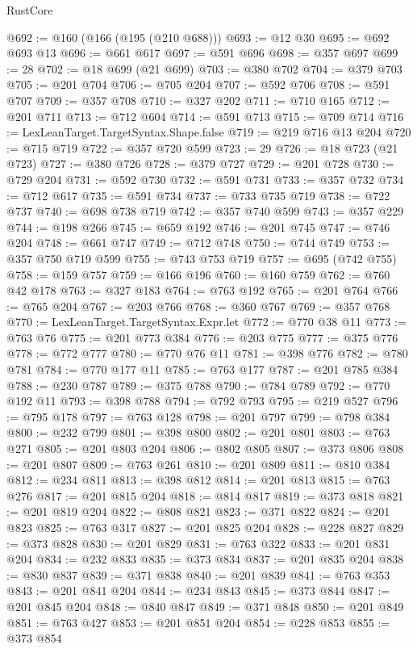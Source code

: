 \begin{lexlean}{RustCore}
\begin{coremodule}
@692 := @160 (@166 (@195 (@210 @688)))
@693 := @12 @30
@695 := @692 @693 @13
@696 := @661 @617
@697 := @591 @696
@698 := @357 @697
@699 := 28
@702 := @18 @699 (@21 @699)
@703 := @380 @702
@704 := @379 @703
@705 := @201 @704
@706 := @705 @204
@707 := @592 @706
@708 := @591 @707
@709 := @357 @708
@710 := @327 @202
@711 := @710 @165
@712 := @201 @711
@713 := @712 @604
@714 := @591 @713
@715 := @709 @714
@716 := LexLeanTarget.TargetSyntax.Shape.false
@719 := @219 @716 @13 @204
@720 := @715 @719
@722 := @357 @720 @599
@723 := 29
@726 := @18 @723 (@21 @723)
@727 := @380 @726
@728 := @379 @727
@729 := @201 @728
@730 := @729 @204
@731 := @592 @730
@732 := @591 @731
@733 := @357 @732
@734 := @712 @617
@735 := @591 @734
@737 := @733 @735 @719
@738 := @722 @737
@740 := @698 @738 @719
@742 := @357 @740 @599
@743 := @357 @229
@744 := @198 @266
@745 := @659 @192
@746 := @201 @745
@747 := @746 @204
@748 := @661 @747
@749 := @712 @748
@750 := @744 @749
@753 := @357 @750 @719 @599
@755 := @743 @753 @719
@757 := @695 (@742 @755)
@758 := @159 @757
@759 := @166 @196
@760 := @160 @759
@762 := @760 @42 @178
@763 := @327 @183
@764 := @763 @192
@765 := @201 @764
@766 := @765 @204
@767 := @203 @766
@768 := @360 @767
@769 := @357 @768
@770 := LexLeanTarget.TargetSyntax.Expr.let
@772 := @770 @38 @11
@773 := @763 @76
@775 := @201 @773 @384
@776 := @203 @775
@777 := @375 @776
@778 := @772 @777
@780 := @770 @76 @11
@781 := @398 @776
@782 := @780 @781
@784 := @770 @177 @11
@785 := @763 @177
@787 := @201 @785 @384
@788 := @230 @787
@789 := @375 @788
@790 := @784 @789
@792 := @770 @192 @11
@793 := @398 @788
@794 := @792 @793
@795 := @219 @527
@796 := @795 @178
@797 := @763 @128
@798 := @201 @797
@799 := @798 @384
@800 := @232 @799
@801 := @398 @800
@802 := @201 @801
@803 := @763 @271
@805 := @201 @803 @204
@806 := @802 @805
@807 := @373 @806
@808 := @201 @807
@809 := @763 @261
@810 := @201 @809
@811 := @810 @384
@812 := @234 @811
@813 := @398 @812
@814 := @201 @813
@815 := @763 @276
@817 := @201 @815 @204
@818 := @814 @817
@819 := @373 @818
@821 := @201 @819 @204
@822 := @808 @821
@823 := @371 @822
@824 := @201 @823
@825 := @763 @317
@827 := @201 @825 @204
@828 := @228 @827
@829 := @373 @828
@830 := @201 @829
@831 := @763 @322
@833 := @201 @831 @204
@834 := @232 @833
@835 := @373 @834
@837 := @201 @835 @204
@838 := @830 @837
@839 := @371 @838
@840 := @201 @839
@841 := @763 @353
@843 := @201 @841 @204
@844 := @234 @843
@845 := @373 @844
@847 := @201 @845 @204
@848 := @840 @847
@849 := @371 @848
@850 := @201 @849
@851 := @763 @427
@853 := @201 @851 @204
@854 := @228 @853
@855 := @373 @854

\end{coremodule}
\end{lexlean}
